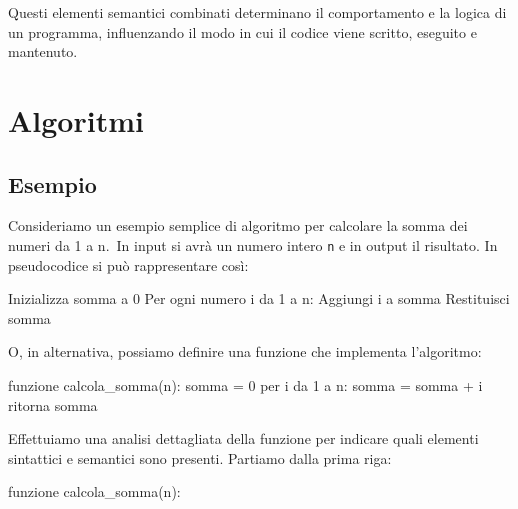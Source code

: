 \documentclass[
  letterpaper,
]{scrbook}
\newenvironment{Shaded}{\begin{snugshade}}{\end{snugshade}}
\newcommand{\NormalTok}[1]{\textcolor[rgb]{0.00,0.23,0.31}{#1}}
\begin{document}
Questi elementi semantici combinati determinano il comportamento e la
logica di un programma, influenzando il modo in cui il codice viene
scritto, eseguito e mantenuto.

\section{Algoritmi}\label{algoritmi-1}

\subsection{Esempio}\label{esempio}

Consideriamo un esempio semplice di algoritmo per calcolare la somma dei
numeri da 1 a n.~In input si avrà un numero intero \texttt{n} e in
output il risultato. In pseudocodice si può rappresentare così:

\begin{Shaded}
\begin{Highlighting}[]
\NormalTok{Inizializza somma a 0}
\NormalTok{Per ogni numero i da 1 a n:}
\NormalTok{  Aggiungi i a somma}
\NormalTok{Restituisci somma}
\end{Highlighting}
\end{Shaded}

O, in alternativa, possiamo definire una funzione che implementa
l'algoritmo:

\begin{Shaded}
\begin{Highlighting}[]
\NormalTok{funzione calcola\_somma(n):}
\NormalTok{  somma = 0}
\NormalTok{  per i da 1 a n:}
\NormalTok{    somma = somma + i}
\NormalTok{  ritorna somma}
\end{Highlighting}
\end{Shaded}

Effettuiamo una analisi dettagliata della funzione per indicare quali
elementi sintattici e semantici sono presenti. Partiamo dalla prima
riga:

\begin{Shaded}
\begin{Highlighting}[]
\NormalTok{funzione calcola\_somma(n):}
\end{Highlighting}
\end{Shaded}
\end{document}
